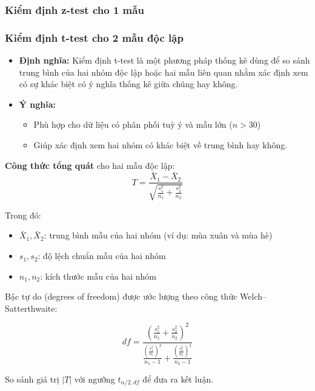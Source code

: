 \subsubsection{Kiểm định z-test cho 1 mẫu}

\subsubsection{Kiểm định t-test cho 2 mẫu độc lập}
\begin{itemize}
    \item \textbf{Định nghĩa:} Kiểm định t-test là một phương pháp thống kê dùng để so sánh trung bình của hai nhóm độc lập hoặc hai mẫu liên quan nhằm xác định xem có sự khác biệt có ý nghĩa thống kê giữa chúng hay không.
    \item \textbf{Ý nghĩa:}
    \begin{itemize}
        \item Phù hợp cho dữ liệu có phân phối tuỳ ý và mẫu lớn ($ n> 30 $)
        \item Giúp xác định xem hai nhóm có khác biệt về trung bình hay không.
    \end{itemize}
\end{itemize}
\begin{boxH}
    \textbf{Công thức tổng quát} cho hai mẫu độc lập:
    \[
T = \frac{\bar{X}_1 - \bar{X}_2}{\sqrt{ \frac{s_1^2}{n_1} + \frac{s_2^2}{n_2} }}
\]

\noindent Trong đó:

\begin{itemize}
    \item \( \bar{X}_1, \bar{X}_2 \): trung bình mẫu của hai nhóm (ví dụ: mùa xuân và mùa hè)
    \item \( s_1, s_2 \): độ lệch chuẩn mẫu của hai nhóm
    \item \( n_1, n_2 \): kích thước mẫu của hai nhóm
\end{itemize}

Bậc tự do (degrees of freedom) được ước lượng theo công thức Welch–Satterthwaite:

\[
df = \frac{\left( \frac{s_1^2}{n_1} + \frac{s_2^2}{n_2} \right)^2}{\frac{ \left( \frac{s_1^2}{n_1} \right)^2 }{n_1 - 1} + \frac{ \left( \frac{s_2^2}{n_2} \right)^2 }{n_2 - 1}}
\]

So sánh giá trị \( |T| \) với ngưỡng \( t_{\alpha/2, df} \) để đưa ra kết luận.
\end{boxH}

